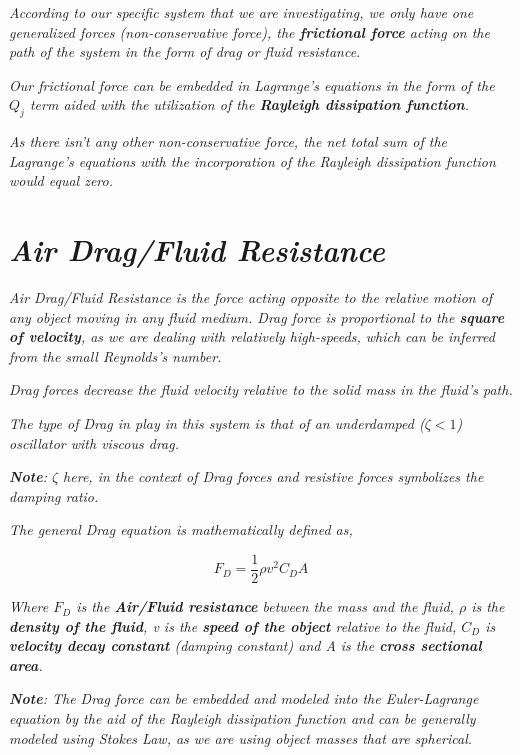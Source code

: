     \textit{According to our specific system that we are investigating, we only have one generalized forces (non-conservative force), the \textbf{frictional force} acting on the path of the system in the form of drag or fluid resistance.}
        
    \textit{Our frictional force can be embedded in Lagrange's equations in the form of the $Q_j$ term aided with the utilization of the \textbf{Rayleigh dissipation function}.}
        
    \textit{As there isn't any other non-conservative force, the net total sum of the Lagrange's equations with the incorporation of the Rayleigh dissipation function would equal zero.}
        
\section{\textit{Air Drag/Fluid Resistance}}
        
    \textit{Air Drag/Fluid Resistance is the force acting opposite to the relative motion of any object moving in any fluid medium. Drag force is proportional to the \textbf{square of velocity}, as we are dealing with relatively high-speeds, which can be inferred from the small Reynolds's number.}
            
    \textit{Drag forces decrease the fluid velocity relative to the solid mass in the fluid's path.}
            
    \textit{The type of Drag in play in this system is that of an underdamped ($\zeta < 1$) oscillator with viscous drag.}
            
    \textit{\textbf{Note}: $\zeta$ here, in the context of Drag forces and resistive forces symbolizes the damping ratio.}
            
    \textit{The general Drag equation is mathematically defined as,}
            
        $$F_D = \frac{1}{2}\rho v^2C_DA$$
           
    \textit{Where $F_D$ is the \textbf{Air/Fluid resistance} between the mass and the fluid, $\rho$ is the \textbf{density of the fluid}, v is the \textbf{speed of the object} relative to the fluid, $C_D$ is \textbf{velocity decay constant} (damping constant) and A is the \textbf{cross sectional area}.}
            
    \textit{\textbf{Note}: The Drag force can be embedded and modeled into the Euler-Lagrange equation by the aid of the Rayleigh dissipation function and can be generally modeled using Stokes Law, as we are using object masses that are spherical.}
            
